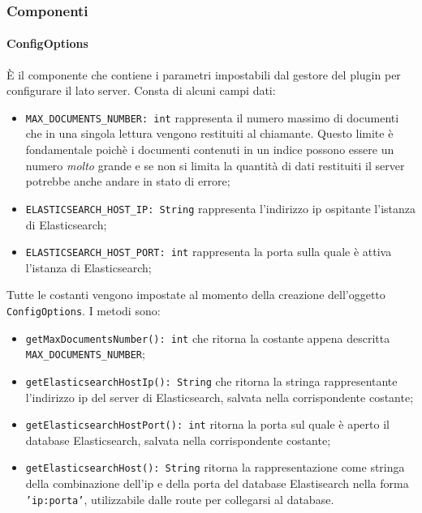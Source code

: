 \subsubsection{Componenti}

\paragraph{ConfigOptions} \Spazio
È il componente che  contiene i parametri impostabili dal gestore del plugin per configurare il lato server. Consta di alcuni campi dati:

\begin{itemize}
	\item \texttt{MAX\_DOCUMENTS\_NUMBER: int} rappresenta il numero massimo di documenti che in una singola lettura vengono restituiti al chiamante. Questo limite è fondamentale poichè i documenti contenuti in un indice possono essere un numero \emph{molto} grande e se non si limita la quantità di dati restituiti il server potrebbe anche andare in stato di errore;
	
	\item \texttt{ELASTICSEARCH\_HOST\_IP: String} rappresenta l'indirizzo ip ospitante l'istanza di Elasticsearch;

	\item \texttt{ELASTICSEARCH\_HOST\_PORT: int} rappresenta la porta sulla quale è attiva l'istanza di Elasticsearch;
\end{itemize} 
Tutte le costanti vengono impostate al momento della creazione dell'oggetto \texttt{ConfigOptions}. I metodi sono: 
\begin{itemize}
	\item \texttt{getMaxDocumentsNumber(): int} che ritorna la costante appena descritta \texttt{MAX\_DOCUMENTS\_NUMBER};
	\item \texttt{getElasticsearchHostIp(): String} che ritorna la stringa rappresentante l'indirizzo ip del server di Elasticsearch, salvata nella corrispondente costante;
	\item \texttt{getElasticsearchHostPort(): int} ritorna la porta sul quale è aperto il database Elasticsearch, salvata nella corrispondente costante; 
	\item \texttt{getElasticsearchHost(): String} ritorna la rappresentazione come stringa della combinazione dell'ip e della porta del database Elastisearch nella forma \texttt{'ip:porta'}, utilizzabile dalle route per collegarsi al database.
\end{itemize}

